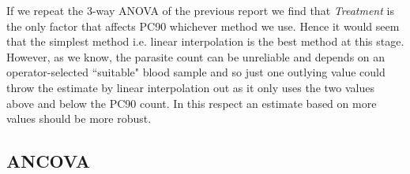 If we repeat the 3-way ANOVA of the previous report we find that \emph{Treatment} is the only factor that affects PC90 whichever method we use. Hence it would seem that the simplest method i.e. linear interpolation is the best method at this stage. However, as we know, the parasite count can be unreliable and depends on an operator-selected ``suitable" blood sample and so just one outlying value could throw the estimate by linear interpolation out as it only uses the two values above and below the PC90 count. In this respect an estimate based on more values should be more robust.

\subsection{ANCOVA}